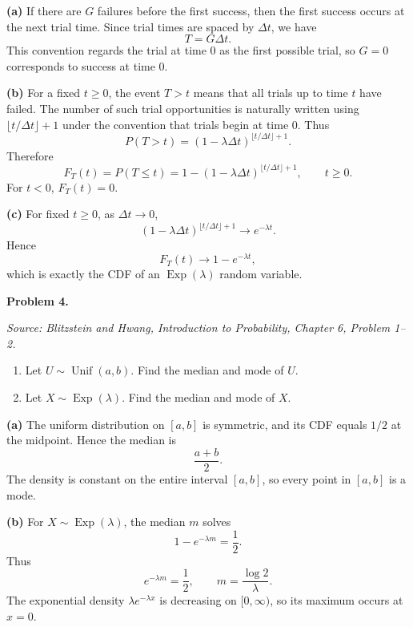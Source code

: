 \documentclass[11pt]{article}
\newcommand{\source}[2]{%
    \vspace{0.15cm}
    {\small\textit{Source: Blitzstein and Hwang, \textit{Introduction to Probability}, Chapter #1, Problem #2.}}
}
\begin{document}
\begin{solutionbox}
\textbf{(a)} If there are $G$ failures before the first success, then the first success occurs at the next trial time. Since trial times are spaced by $\Delta t$, we have
\[
T=G\Delta t.
\]
This convention regards the trial at time 0 as the first possible trial, so $G=0$ corresponds to success at time 0.
 

\textbf{(b)} For a fixed $t\ge0$, the event $T>t$ means that all trials up to time $t$ have failed. The number of such trial opportunities is naturally written using $\lfloor t/\Delta t\rfloor+1$ under the convention that trials begin at time 0. Thus
\[
P(T>t)=\left(1-\lambda\Delta t\right)^{\lfloor t/\Delta t\rfloor+1}.
\]
Therefore
\[
F_T(t)=P(T\le t)=1-\left(1-\lambda\Delta t\right)^{\lfloor t/\Delta t\rfloor+1},
\qquad t\ge0.
\]
For $t<0$, $F_T(t)=0$.
 

\textbf{(c)} For fixed $t\ge0$, as $\Delta t\to0$,
\[
\left(1-\lambda\Delta t\right)^{\lfloor t/\Delta t\rfloor+1}
\longrightarrow
 e^{-\lambda t}.
\]
Hence
\[
F_T(t)
\longrightarrow
1-e^{-\lambda t},
\]
which is exactly the CDF of an $\operatorname{Exp}(\lambda)$ random variable.
 
\end{solutionbox}
\newpage


\begin{problemheader}
\textbf{Problem 4.}
\end{problemheader}
\source{6}{1--2}

\begin{enumerate}[label=(\alph*), leftmargin=*]
    \item Let $U\sim\operatorname{Unif}(a,b)$. Find the median and mode of $U$.

    \item Let $X\sim\operatorname{Exp}(\lambda)$. Find the median and mode of $X$.
\end{enumerate}

\begin{solutionbox}
\textbf{(a)} The uniform distribution on $[a,b]$ is symmetric, and its CDF equals $1/2$ at the midpoint. Hence the median is
\[
\frac{a+b}{2}.
\]
The density is constant on the entire interval $[a,b]$, so every point in $[a,b]$ is a mode.
 

\textbf{(b)} For $X\sim\operatorname{Exp}(\lambda)$, the median $m$ solves
\[
1-e^{-\lambda m}=\frac12.
\]
Thus
\[
e^{-\lambda m}=\frac12,
\qquad
m=\frac{\log 2}{\lambda}.
\]
The exponential density $\lambda e^{-\lambda x}$ is decreasing on $[0,\infty)$, so its maximum occurs at $x=0$.
 
\end{solutionbox}
\newpage
\end{document}
